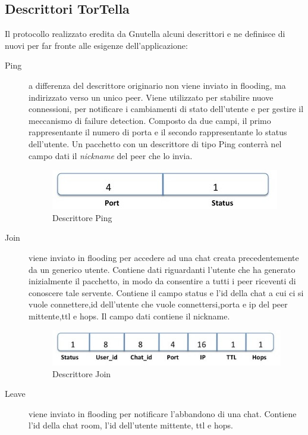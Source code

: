 \subsection{Descrittori TorTella}
Il protocollo realizzato eredita da Gnutella alcuni descrittori e ne definisce di nuovi per far fronte alle esigenze dell’applicazione:
\begin{description}
\item[Ping] a differenza del descrittore originario non viene inviato in flooding, ma indirizzato verso un unico peer. Viene utilizzato per stabilire nuove connessioni, per notificare i cambiamenti di stato dell'utente e per gestire il meccanismo di failure detection. Composto da due campi, il primo rappresentante il numero di porta e il secondo rappresentante lo status dell’utente. Un pacchetto con un descrittore di tipo Ping conterrà nel campo dati il \textit{nickname} del peer che lo invia.
\begin{figure}[H]
\begin{center}
\includegraphics[scale=0.7]{etc/ping.jpg}
\caption{Descrittore Ping}
\label{ping}
\end{center}
\end{figure}
\item[Join] viene inviato in flooding per accedere ad una chat creata precedentemente da un generico utente. Contiene dati riguardanti l'utente che ha generato inizialmente il pacchetto, in modo da consentire a tutti i peer riceventi di conoscere tale servente. Contiene il campo status e l’id della chat a cui ci si vuole connettere,id dell'utente che vuole connettersi,porta e ip del peer mittente,ttl e hops. Il campo dati contiene il nickname.
\begin{figure}[H]
\begin{center}
\includegraphics[scale=0.7]{etc/join.jpg}
\caption{Descrittore Join}
\label{join}
\end{center}
\end{figure}
\item[Leave] viene inviato in flooding per notificare l'abbandono di una chat. Contiene l’id della chat room, l'id dell'utente mittente, ttl e hops.

\end{description}
